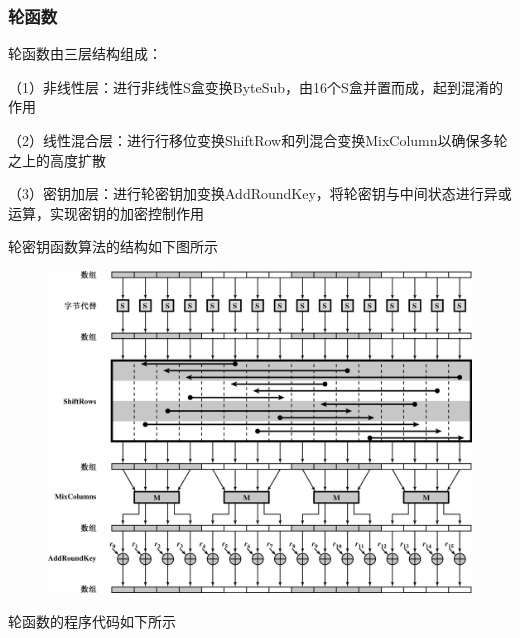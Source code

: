 \documentclass[a4paper,11pt,UTF8]{ctexart}
\newcommand{\bottomcaption}{%
\setlength{\abovecaptionskip}{6pt}%
\setlength{\belowcaptionskip}{6pt}%
\caption}
\newcommand{\xiaowuhao}{\fontsize{9pt}{\baselineskip}\selectfont}   %
\begin{document}
        \subsubsection{轮函数}
            轮函数由三层结构组成：\par
            （1）非线性层：进行非线性S盒变换ByteSub，由16个S盒并置而成，起到混淆的作用\par
            （2）线性混合层：进行行移位变换ShiftRow和列混合变换MixColumn以确保多轮之上的高度扩散\par
            （3）密钥加层：进行轮密钥加变换AddRoundKey，将轮密钥与中间状态进行异或运算，实现密钥的加密控制作用\par
\newpage
            轮密钥函数算法的结构如下图所示
            \begin{figure}[H]
                \centering
                \includegraphics[width=13cm]{轮函数算法结构.png}
                \bottomcaption{\xiaowuhao{轮函数算法结构}}
            \end{figure}
            轮函数的程序代码如下所示
            
\end{document}
